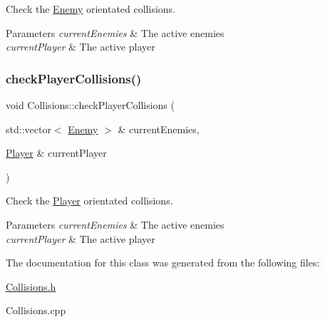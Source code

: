 Check the \hyperlink{class_enemy}{Enemy} orientated collisions. 


\begin{DoxyParams}{Parameters}
{\em current\+Enemies} & The active enemies \\
\hline
{\em current\+Player} & The active player \\
\hline
\end{DoxyParams}
\mbox{\label{class_collisions_a990174c72f4771e6c2a8c014bd873513}} 
\subsubsection{\texorpdfstring{check\+Player\+Collisions()}{checkPlayerCollisions()}}
{\footnotesize\ttfamily void Collisions\+::check\+Player\+Collisions (\begin{DoxyParamCaption}\item[{std\+::vector$<$ \hyperlink{class_enemy}{Enemy} $>$ \&}]{current\+Enemies,  }\item[{\hyperlink{class_player}{Player} \&}]{current\+Player }\end{DoxyParamCaption})}



Check the \hyperlink{class_player}{Player} orientated collisions. 


\begin{DoxyParams}{Parameters}
{\em current\+Enemies} & The active enemies \\
\hline
{\em current\+Player} & The active player \\
\hline
\end{DoxyParams}


The documentation for this class was generated from the following files\+:\begin{DoxyCompactItemize}
\item 
\hyperlink{_collisions_8h}{Collisions.\+h}\item 
Collisions.\+cpp\end{DoxyCompactItemize}
